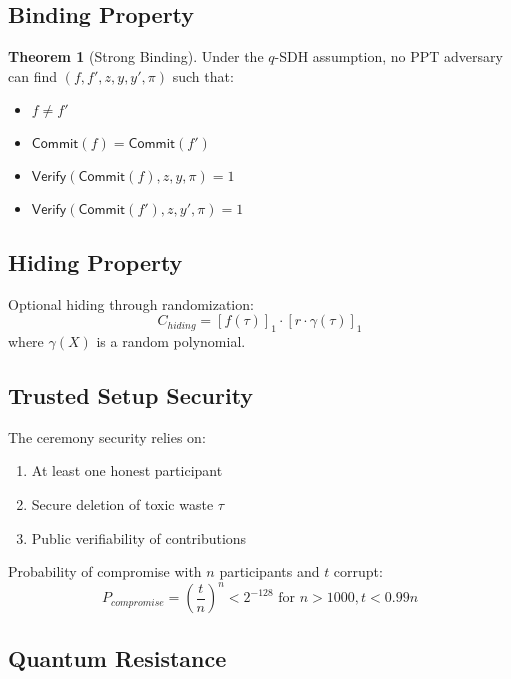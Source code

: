 \documentclass[11pt,a4paper]{article}
\theoremstyle{definition}
\newtheorem{theorem}{Theorem}
\begin{document}
\subsection{Binding Property}

\begin{theorem}[Strong Binding]
Under the $q$-SDH assumption, no PPT adversary can find $(f, f', z, y, y', \pi)$ such that:
\begin{itemize}
    \item $f \neq f'$
    \item $\mathsf{Commit}(f) = \mathsf{Commit}(f')$
    \item $\mathsf{Verify}(\mathsf{Commit}(f), z, y, \pi) = 1$
    \item $\mathsf{Verify}(\mathsf{Commit}(f'), z, y', \pi) = 1$
\end{itemize}
\end{theorem}

\subsection{Hiding Property}

Optional hiding through randomization:
\begin{equation}
    C_{hiding} = [f(\tau)]_1 \cdot [r \cdot \gamma(\tau)]_1
\end{equation}
where $\gamma(X)$ is a random polynomial.

\subsection{Trusted Setup Security}

The ceremony security relies on:
\begin{enumerate}
    \item At least one honest participant
    \item Secure deletion of toxic waste $\tau$
    \item Public verifiability of contributions
\end{enumerate}

Probability of compromise with $n$ participants and $t$ corrupt:
\begin{equation}
    P_{compromise} = \left(\frac{t}{n}\right)^n < 2^{-128} \text{ for } n > 1000, t < 0.99n
\end{equation}

\subsection{Quantum Resistance}
\end{document}
